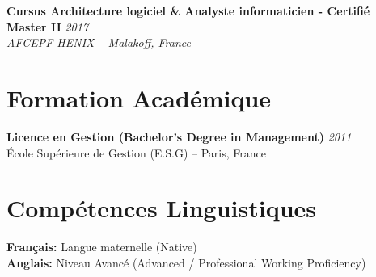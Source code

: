 \documentclass[11pt,a4paper]{article}
\begin{document}
\textbf{Cursus Architecture logiciel \& Analyste informaticien - Certifié Master II} \hfill \textit{2017}\\
\textit{AFCEPF-HENIX -- Malakoff, France}

\section*{Formation Académique}

\textbf{Licence en Gestion (Bachelor's Degree in Management)} \hfill \textit{2011}\\
École Supérieure de Gestion (E.S.G) -- Paris, France

\section*{Compétences Linguistiques}

\textbf{Français:} Langue maternelle (Native)\\
\textbf{Anglais:} Niveau Avancé (Advanced / Professional Working Proficiency)
\end{document}
